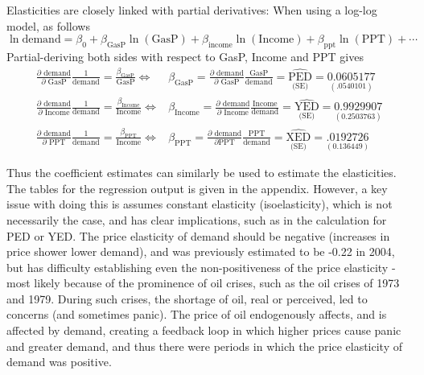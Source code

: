 \documentclass{article}
\begin{document}
\begin{enumerate}[label=\alph*.]
Elasticities are closely linked with partial derivatives: When using a log-log model, as follows
$$ \ln{\text{demand}}	 = \beta_0 +\beta_{\text{GasP}} \ln( \text{GasP}) + \beta_{\text{income}}\ln( \text{Income}) + \beta_{\text{ppt}} \ln (\text{PPT} )+\cdots $$
Partial-deriving both sides with respect to GasP, Income and PPT gives
\begin{align*}
\frac{\partial \text{ demand}}{ \partial \text{ GasP}} \frac{1}{\text{demand}}= \frac{\beta_{\text{GasP}}}{\text{GasP}}  \iff & \beta_{\text{GasP}} =  \frac{\partial \text{ demand}}{ \partial \text{ GasP}} \frac{\text{GasP}}{\text{demand}} = \underset{\text{(SE)}}{\widehat{\text{PED}}} = \underset{(.0540101)}{0.0605177} \\
\frac{\partial \text{ demand}}{ \partial \text{ Income}} \frac{1}{\text{demand}}= \frac{\beta_{\text{Income}}}{\text{Income}}  \iff & \beta_{\text{Income}} =  \frac{\partial \text{ demand}}{ \partial \text{ Income}} \frac{\text{Income}}{\text{demand}} = \underset{\text{(SE)}}{\widehat{\text{YED}}} = \underset{(0.2503763)}{0.9929907}\\
 \frac{\partial \text{ demand}}{ \partial \text{ PPT}} \frac{1}{\text{demand}}= \frac{\beta_{\text{PPT}}}{\text{Income}}  \iff & \beta_{\text{PPT}} =  \frac{\partial \text{ demand}}{ \partial \text{PPT}} \frac{\text{PPT}}{\text{demand}} = \underset{\text{(SE)}}{\widehat{\text{XED}}} = \underset{(0.136449)}{.0192726}
\end{align*}

Thus the coefficient estimates can similarly be used to estimate the elasticities. The tables for the regression output is given in the appendix.  However, a key issue with doing this is assumes constant elasticity (isoelasticity), which is not necessarily the case, and has clear implications, such as in the calculation for PED or YED. The price elasticity of demand should be negative (increases in price shower lower demand), and was previously estimated to be -0.22 in 2004, but has difficulty establishing even the non-positiveness of the price elasticity - most likely because of the prominence of oil crises, such as the oil crises of 1973 and 1979. During such crises, the shortage of oil, real or perceived, led to concerns (and sometimes panic). The price of oil endogenously affects, and is affected by demand, creating a feedback loop in which higher prices cause panic and greater demand, and thus there were periods in which the price elasticity of demand was positive.
\\
 

\end{enumerate}
\end{document}

